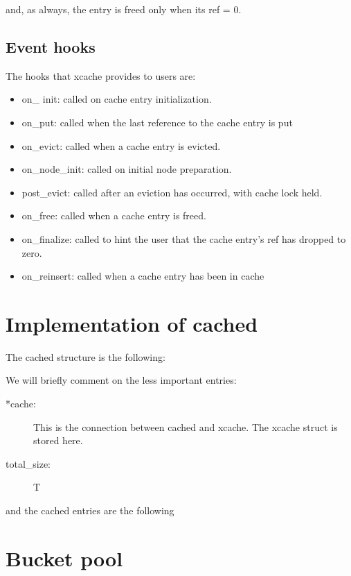 and, as always, the entry is freed only when its ref = 0.

\subsection{Event hooks}

The hooks that xcache provides to users are:

\begin{itemize}
	\item on\_ init: called on cache entry initialization.
	\item on\_put: called when the last reference to the cache entry is put
	\item on\_evict: called when a cache entry is evicted.
	\item on\_node\_init: called on initial node preparation.
	\item post\_evict: called after an eviction has occurred, with cache  
		lock held.
	\item on\_free: called when a cache entry is freed.
	\item on\_finalize: called to hint the user that the cache entry's ref 
		has dropped to zero.
	\item on\_reinsert: called when a cache entry has been in cache
\end{itemize}


\section{Implementation of cached}\label{sec:cached-imp}

The cached structure is the following:


We will briefly comment on the less important entries:

\begin{description}
	\item[*cache:]
		This is the connection between cached and xcache. The xcache struct is 
		stored here.
	\item[total\_size:]
		T
\end{description}

and the cached entries are the following


\section{Bucket pool}

